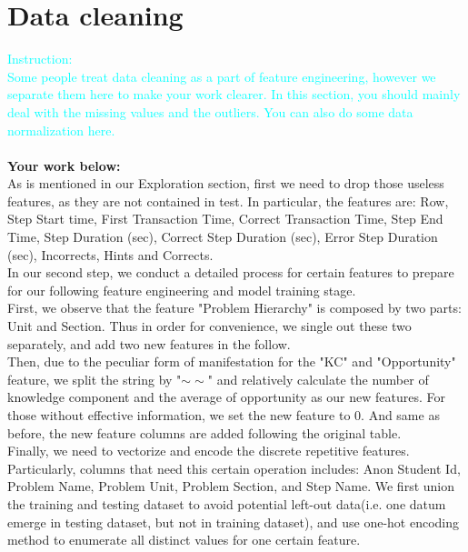 \documentclass{article}
\begin{document}
\section{Data cleaning}
\textcolor{cyan}{Instruction: \\
Some people treat data cleaning as a part of feature engineering, however we separate them here to make your work clearer. In this section, you should mainly deal with the missing values and the outliers. You can also do some data normalization here.}\\\\
\textbf{Your work below:}\\
As is mentioned in our Exploration section, first we need to drop those useless features, as they are not contained in test. In particular,
the features are: Row, Step Start time, First Transaction Time, Correct Transaction Time, Step End Time, Step Duration (sec), 
Correct Step Duration (sec), Error Step Duration (sec), Incorrects, Hints and Corrects.\\
In our second step, we conduct a detailed process for certain features to prepare for our following feature engineering and model training stage.\\
First, we observe that the feature "Problem Hierarchy" is composed by two parts: Unit and Section. Thus in order for convenience, we single out these two separately, and add two new features in the follow.\\
Then, due to the peculiar form of manifestation for the "KC" and "Opportunity" feature, we split the string by "$\sim \sim$" and relatively calculate the number of knowledge component and the average of opportunity as our new features.
For those without effective information, we set the new feature to 0. And same as before, the new feature columns are added following the original table.\\
Finally, we need to vectorize and encode the discrete repetitive features. Particularly, columns that need this certain operation includes: Anon Student Id, Problem Name, Problem Unit, Problem Section, and Step Name.
We first union the training and testing dataset to avoid potential left-out data(i.e. one datum emerge in testing dataset, but not in training dataset), and use one-hot encoding
method to enumerate all distinct values for one certain feature.
\end{document}
